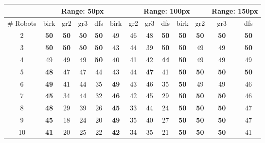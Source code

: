 \begin{tabular}{|c|c|c|c|c|c|c|c|c|c|c|c|c|}
\hline
& \multicolumn{5}{|c|}{Range: 50px} & \multicolumn{5}{|c|}{Range: 100px} & \multicolumn{5}{|c|}{Range: 150px} \\ \hline
\# Robots & birk & gr2 & gr3 & dfs & birk & gr2 & gr3 & dfs & birk & gr2 & gr3 & dfs \\ \hline
2 & \textbf{50} & \textbf{50} & \textbf{50} & \textbf{50} & 49 & 46 & 48 & \textbf{50} & \textbf{50} & \textbf{50} & \textbf{50} & \textbf{50} \\ \hline
3 & \textbf{50} & \textbf{50} & \textbf{50} & \textbf{50} & 43 & 44 & 39 & \textbf{50} & \textbf{50} & 49 & 49 & \textbf{50} \\ \hline
4 & 49 & 49 & 49 & \textbf{50} & 40 & 41 & 42 & \textbf{44} & \textbf{50} & 49 & 49 & 49 \\ \hline
5 & \textbf{48} & 47 & 47 & 44 & 43 & 44 & \textbf{47} & 41 & \textbf{50} & \textbf{50} & \textbf{50} & \textbf{50} \\ \hline
6 & \textbf{49} & 41 & 44 & 35 & \textbf{49} & 43 & 46 & 35 & \textbf{50} & 49 & 49 & 46 \\ \hline
7 & \textbf{45} & 34 & 44 & 32 & \textbf{46} & 42 & 45 & 29 & \textbf{50} & \textbf{50} & \textbf{50} & 46 \\ \hline
8 & \textbf{48} & 29 & 39 & 26 & \textbf{45} & 33 & 44 & 24 & \textbf{50} & \textbf{50} & \textbf{50} & 47 \\ \hline
9 & \textbf{45} & 18 & 24 & 20 & \textbf{49} & 35 & 40 & 27 & \textbf{50} & \textbf{50} & \textbf{50} & 47 \\ \hline
10 & \textbf{41} & 20 & 25 & 22 & \textbf{42} & 34 & 35 & 21 & \textbf{50} & \textbf{50} & \textbf{50} & 41 \\ \hline
\end{tabular}